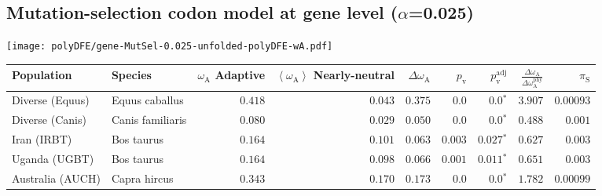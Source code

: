 
\subsection{Mutation-selection codon model at gene level ($\alpha$=0.025)}
\begin{center}
\texttt{[image: polyDFE/gene-MutSel-0.025-unfolded-polyDFE-wA.pdf]}
\begin{adjustbox}{width = 1\textwidth}
\begin{tabular}{|l|l|r|r|r|r|r|r|r|}
\toprule
                     Population &              Species & \specialcell{$\omega_{\mathrm{A}}$ \\ Adaptive} & \specialcell{$\left< \omega_{\mathrm{A}} \right>$ \\ Nearly-neutral} & $\Delta \omega_{\mathrm{A}} $ & $p_{\mathrm{v}}$ & $p_{\mathrm{v}}^{\mathrm{adj}}$ & $\frac{\Delta\omega_{\mathrm{A}}}{\Delta\omega_{\mathrm{A}}^{\mathrm{phy}}}$ & $\pi_{\textrm{S}}$ \\
\midrule
                Diverse (Equus) &       Equus caballus &                                        $ 0.418$ &                                           $ 0.043$ &                      $ 0.375$ &            $0.0$ &                  $\bm{0.0{^*}}$ &                                           $ 3.907$ &          $0.00093$ \\
                Diverse (Canis) &     Canis familiaris &                                        $ 0.080$ &                                           $ 0.029$ &                      $ 0.050$ &            $0.0$ &                  $\bm{0.0{^*}}$ &                                           $ 0.488$ &           $ 0.001$ \\
                    Iran (IRBT) &           Bos taurus &                                        $ 0.164$ &                                           $ 0.101$ &                      $ 0.063$ &         $ 0.003$ &               $\bm{ 0.027{^*}}$ &                                           $ 0.627$ &           $ 0.003$ \\
                  Uganda (UGBT) &           Bos taurus &                                        $ 0.164$ &                                           $ 0.098$ &                      $ 0.066$ &         $ 0.001$ &               $\bm{ 0.011{^*}}$ &                                           $ 0.651$ &           $ 0.003$ \\
               Australia (AUCH) &         Capra hircus &                                        $ 0.343$ &                                           $ 0.170$ &                      $ 0.173$ &            $0.0$ &                  $\bm{0.0{^*}}$ &                                           $ 1.782$ &          $0.00099$ \\

\end{tabular}
\end{adjustbox}
\end{center}
